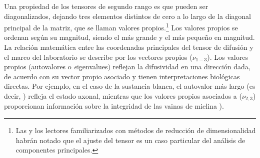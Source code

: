 %     

Una propiedad de los tensores de segundo rango es que pueden ser diagonalizados, dejando tres elementos distintos de cero a lo largo de la diagonal principal de la matriz, que se llaman valores propios.\footnote{Las y los lectores familiarizados con métodos de reducción de dimensionalidad habrán notado que el ajuste del tensor es un caso particular del análisis de componentes principales.} Los valores propios se ordenan según su magnitud, siendo \lone el más grande y \lthree el más pequeño en magnitud. La relación matemática entre las coordenadas principales del tensor de difusión y el marco del laboratorio se describe por los vectores propios ($\nu_{1-3}$). Los valores propios (autovalores o {\emph eigenvalues}) reflejan la difusividad en una dirección dada, de acuerdo con su vector propio asociado y tienen interpretaciones biológicas directas. Por ejemplo, en el caso de la sustancia blanca, el autovalor más largo (es decir, \lone) refleja el estado axonal, mientras que los valores propios asociados a ($\nu_{2,3}$) proporcionan información sobre la integridad de las vainas de mielina \cite{Song_2003,Concha_2006}).

